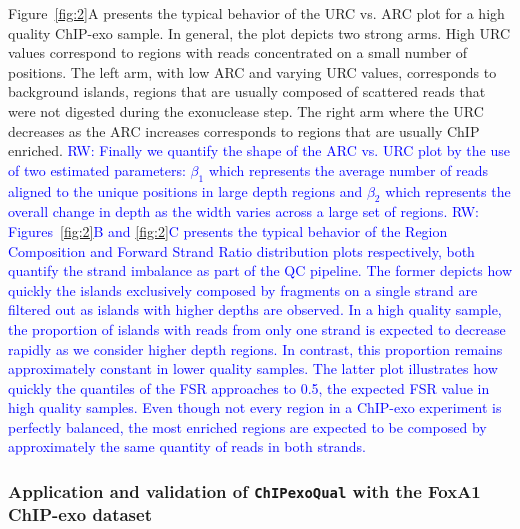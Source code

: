 \documentclass{bmcart}
\newcommand{\pname}[1]{\texttt{ChIPexoQual}}
\newcommand{\SK}[1]{\textcolor{red}{SK: #1}}
\newcommand{\RW}[1]{\textcolor{blue}{RW: #1}}
\begin{document}
Figure~\ref{fig:2}A presents the typical behavior of the URC vs. ARC
plot for a high quality ChIP-exo sample. In general, the plot depicts
two strong arms.  High URC values correspond to regions with reads
concentrated on a small number of positions.  The left arm, with low
ARC and varying URC values, corresponds to background islands, regions
that are usually composed of scattered reads that were not digested
during the exonuclease step. The right arm where the URC decreases as
the ARC increases corresponds to regions that are usually ChIP
enriched. \RW{Finally we quantify the shape of the ARC vs. URC plot by
  the use of two estimated parameters: $\beta_1$ which
  represents the average number of reads aligned to the unique
  positions in large depth regions and $\beta_2$ which
  represents the overall change in depth as the width varies across a
  large set of regions.}  \RW{Figures~\ref{fig:2}B and \ref{fig:2}C
  presents the typical behavior of the Region Composition and Forward
  Strand Ratio distribution plots respectively, both quantify the
  strand imbalance as part of the QC pipeline. The former depicts how
  quickly the islands exclusively composed by fragments on a single
  strand are filtered out as islands with higher depths are
  observed. In a high quality sample, the proportion of islands with
  reads from only one strand is expected to decrease rapidly as we
  consider higher depth regions. In contrast, this proportion remains
  approximately constant in lower quality samples. The latter plot
  illustrates how quickly the quantiles of the FSR approaches to 0.5,
  the expected FSR value in high quality samples. Even though not
  every region in a ChIP-exo experiment is perfectly balanced, the
  most enriched regions are expected to be composed by approximately
  the same quantity of reads in both strands.}



\subsubsection*{Application and validation of \pname{} with the FoxA1
  ChIP-exo dataset}
\end{document}
